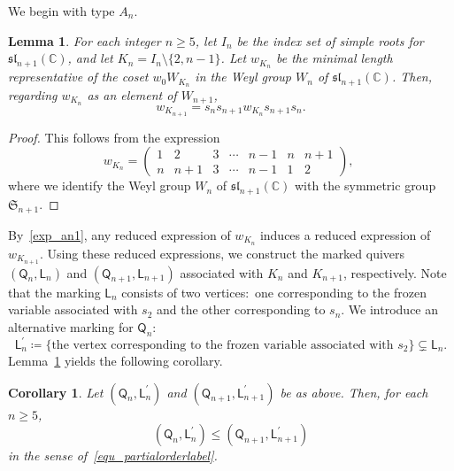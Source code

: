 \documentclass[11pt]{amsart}
\newcommand{\C}{\mathbb{C}}
\def\frak{\mathfrak}
\numberwithin{equation}{section}
\theoremstyle{plain}
\newtheorem{corollary}[theorem]{Corollary}
\newtheorem{lemma}[theorem]{Lemma}
\theoremstyle{definition}
\numberwithin{equation}{section}
\begin{document}
We begin with type $A_n$.

\begin{lemma}\label{lemma_an1}
For each integer $n \geq 5$, let $I_n$ be the index set of simple roots for $\frak{sl}_{n+1}(\C)$, and let $K_{n} = I_n \setminus \{2, n-1\}$. Let $w_{K_n}$ be the minimal length representative of the coset $w_0 W_{K_n}$ in the Weyl group $W_n$ of $\frak{sl}_{n+1}(\C)$. Then, regarding $w_{K_{n}}$ as an element of $W_{n+1}$, 
\begin{equation}\label{exp_an1}
w_{K_{n+1}} = s_{n} s_{n+1} w_{K_n} s_{n+1} s_n.
\end{equation}
\end{lemma}

\begin{proof}
This follows from the expression
$$
w_{K_{n}} = 
\left(\begin{array}{cc|ccc|cc}
1 & 2 & 3 & \cdots & n-1 & n& n+1 \\
n  & n+1 & 3 & \cdots & n-1 & 1 & 2
\end{array}\right), \,\,
$$
where we identify the Weyl group $W_n$ of $\frak{sl}_{n+1}(\C)$ with the symmetric group $\frak{S}_{n+1}$. 
\end{proof}

By~\eqref{exp_an1}, any reduced expression of $w_{K_{n}}$ induces a reduced expression of $w_{K_{n+1}}$. Using these reduced expressions, we construct the marked quivers  $(\mathsf{Q}_n, \mathsf{L}_n)$ and $(\mathsf{Q}_{n+1}, \mathsf{L}_{n+1})$ associated with $K_{n}$ and $K_{n+1}$, respectively. Note that the marking $\mathsf{L}_n$ consists of two vertices$\colon$ one corresponding to the frozen variable associated with $s_2$ and the other corresponding to $s_n$. We introduce an alternative marking for $\mathsf{Q}_n \colon$
$$
\mathsf{L}^\prime_n \coloneqq \{ \mbox{the vertex corresponding to the frozen variable associated with $s_2$}\} \subsetneq \mathsf{L}_n.
$$
Lemma~\ref{lemma_an1} yields the following corollary.

\begin{corollary}\label{cor_an1}
Let $(\mathsf{Q}_n, \mathsf{L}^\prime_n)$ and $(\mathsf{Q}_{n+1}, \mathsf{L}^\prime_{n+1})$ be as above. Then, for each $n \geq 5$, 
$$
(\mathsf{Q}_n, \mathsf{L}^\prime_n) \leq (\mathsf{Q}_{n+1}, \mathsf{L}^\prime_{n+1})
$$ 
in the sense of~\eqref{equ_partialorderlabel}.
\end{corollary}
\end{document}
